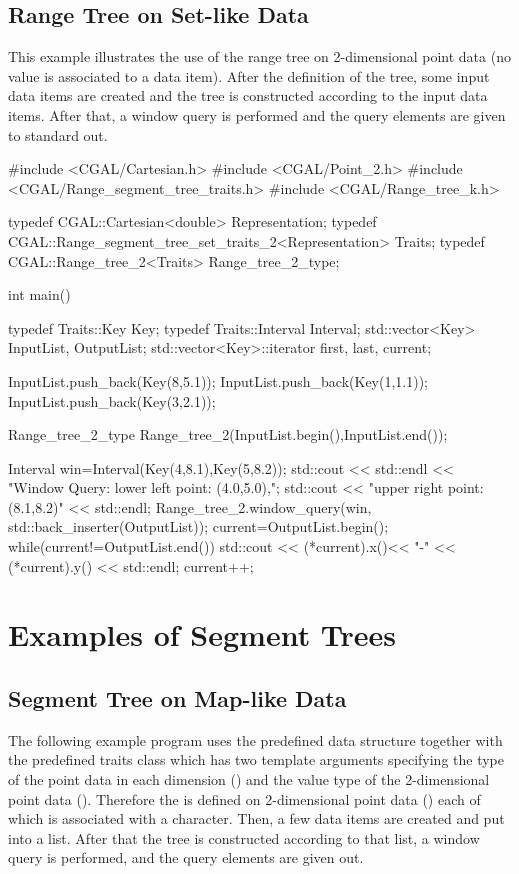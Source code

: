 \subsection{Range Tree on Set-like Data}

This example illustrates the use of the range tree on
2-dimensional point data (no value is associated to a data item).
After the definition of the tree, some input data items are
created and the tree is constructed according to the input data
items.
After that, a window query is performed and the query elements
are given to standard out.

\begin{cprog}
#include <CGAL/Cartesian.h>
#include <CGAL/Point_2.h>
#include <CGAL/Range_segment_tree_traits.h>
#include <CGAL/Range_tree_k.h>

typedef CGAL::Cartesian<double> Representation;
typedef CGAL::Range_segment_tree_set_traits_2<Representation> Traits;
typedef CGAL::Range_tree_2<Traits> Range_tree_2_type;

int main()
{
  typedef Traits::Key Key;
  typedef Traits::Interval Interval;
  std::vector<Key> InputList, OutputList;
  std::vector<Key>::iterator first, last, current;

  InputList.push_back(Key(8,5.1));
  InputList.push_back(Key(1,1.1));
  InputList.push_back(Key(3,2.1));

  Range_tree_2_type Range_tree_2(InputList.begin(),InputList.end());

  Interval win=Interval(Key(4,8.1),Key(5,8.2));
  std::cout << std::endl << "Window Query: lower left point: (4.0,5.0),";
  std::cout << "upper right point: (8.1,8.2)" << std::endl;
  Range_tree_2.window_query(win, std::back_inserter(OutputList));
  current=OutputList.begin();
  while(current!=OutputList.end()){
    std::cout << (*current).x()<< "-" << (*current).y() << std::endl;
    current++;
  }
}
\end{cprog}

\section{Examples of Segment Trees\label{User:RangeSegment:User:Segment}}
\subsection{Segment Tree on Map-like Data}

The following example program uses the predefined  data structure together with the predefined traits
  class  which has two template arguments
  specifying the
  type of the point data in each dimension
  () and the value type of the
  2-dimensional point data (). Therefore the  is defined on 2-dimensional point data
  () each of which is
  associated with a character.
Then, a few data items are created and put into a list. After
  that the tree is constructed according to that list, a window
  query is performed, and the query elements are given out.



